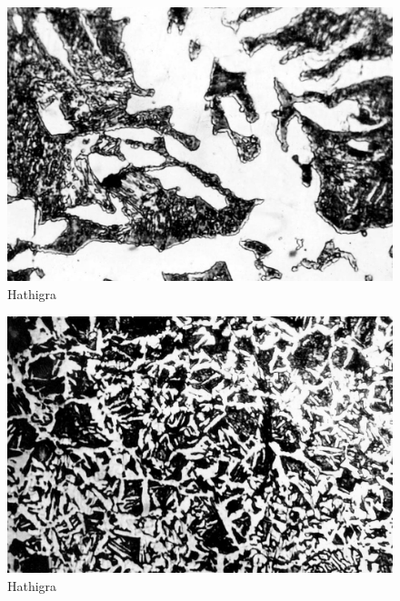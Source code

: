 \begin{figure}[H]
\renewcommand{\thefigure}{18A}
\includegraphics[scale=1]{images/chapter-4/fig018A.jpg}
\caption{Hathigra}\label{chapter-4-fig18A}
\end{figure}
\begin{figure}[H]
\renewcommand{\thefigure}{18B}
\includegraphics[scale=1]{images/chapter-4/fig018B.jpg}
\caption{Hathigra}\label{chapter-4-fig18B}
\end{figure}

\newpage

